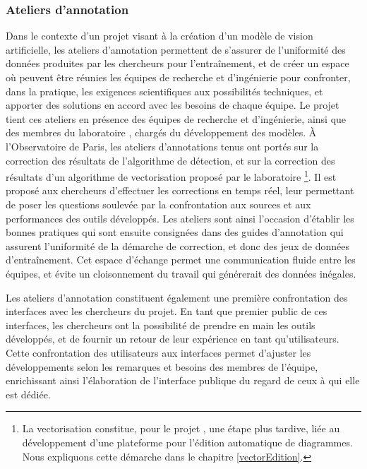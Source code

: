     \subsubsection{Ateliers d'annotation}
    Dans le contexte d'un projet visant à la création d'un modèle de vision artificielle, les ateliers d'annotation permettent de s'assurer de l'uniformité des données produites par les chercheurs pour l'entraînement, et de créer un espace où peuvent être réunies les équipes de recherche et d'ingénierie pour confronter, dans la pratique, les exigences scientifiques aux possibilités techniques, et apporter des solutions en accord avec les besoins de chaque équipe. Le projet \eida tient ces ateliers en présence des équipes de recherche et d'ingénierie, ainsi que des membres du laboratoire \imagine, chargés du développement des modèles. À l'Observatoire de Paris, les ateliers d'annotations tenus ont portés sur la correction des résultats de l'algorithme de détection, et sur la correction des résultats d'un algorithme de vectorisation proposé par le laboratoire \imagine\footnote{La vectorisation constitue, pour le projet \eida, une étape plus tardive, liée au développement d'une plateforme pour l'édition automatique de diagrammes. Nous expliquons cette démarche dans le chapitre \ref{vectorEdition}.}. Il est proposé aux chercheurs d'effectuer les corrections en temps réel, leur permettant de poser les questions soulevée par la confrontation aux sources et aux performances des outils développés. Les ateliers sont ainsi l'occasion d'établir les bonnes pratiques qui sont ensuite consignées dans des guides d'annotation qui assurent l'uniformité de la démarche de correction, et donc des jeux de données d'entraînement. Cet espace d'échange permet une communication fluide entre les équipes, et évite un cloisonnement du travail qui générerait des données inégales.
    
    Les ateliers d'annotation constituent également une première confrontation des interfaces avec les chercheurs du projet. En tant que premier public de ces interfaces, les chercheurs ont la possibilité de prendre en main les outils développés, et de fournir un retour de leur expérience en tant qu'utilisateurs. Cette confrontation des utilisateurs aux interfaces permet d'ajuster les développements selon les remarques et besoins des membres de l'équipe, enrichissant ainsi l'élaboration de l'interface publique du regard de ceux à qui elle est dédiée.

    
